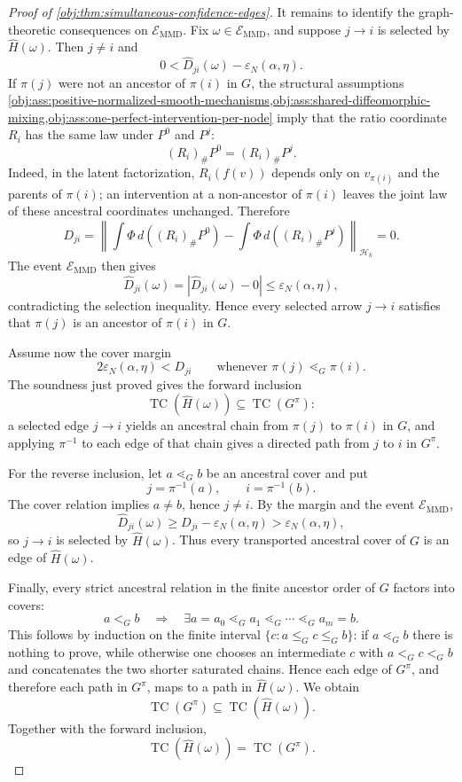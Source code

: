\begin{proof}[Proof of \cref{obj:thm:simultaneous-confidence-edges}]
It remains to identify the graph-theoretic consequences on \(\mathcal E_{\mathrm{MMD}}\).  Fix \(\omega\in\mathcal E_{\mathrm{MMD}}\), and suppose \(j\to i\) is selected by \(\widehat H(\omega)\).  Then \(j\ne i\) and
\[
0<\widehat D_{ji}(\omega)-\varepsilon_N(\alpha,\eta).
\]
If \(\pi(j)\) were not an ancestor of \(\pi(i)\) in \(G\), the structural assumptions
\cref{obj:ass:positive-normalized-smooth-mechanisms,obj:ass:shared-diffeomorphic-mixing,obj:ass:one-perfect-intervention-per-node} imply that the ratio coordinate \(R_i\) has the same law under \(P^0\) and \(P^j\):
\[
(R_i)_\#P^0=(R_i)_\#P^j.
\]
Indeed, in the latent factorization, \(R_i(f(v))\) depends only on \(v_{\pi(i)}\) and the parents of \(\pi(i)\); an intervention at a non-ancestor of \(\pi(i)\) leaves the joint law of these ancestral coordinates unchanged.  Therefore
\[
D_{ji}
=
\left\|
\int\Phi\,d((R_i)_\#P^0)
-
\int\Phi\,d((R_i)_\#P^j)
\right\|_{\mathcal H_k}
=0.
\]
The event \(\mathcal E_{\mathrm{MMD}}\) then gives
\[
\widehat D_{ji}(\omega)
=
|\widehat D_{ji}(\omega)-0|
\le
\varepsilon_N(\alpha,\eta),
\]
contradicting the selection inequality.  Hence every selected arrow \(j\to i\) satisfies that \(\pi(j)\) is an ancestor of \(\pi(i)\) in \(G\).

Assume now the cover margin
\[
2\varepsilon_N(\alpha,\eta)<D_{ji}
\qquad
\text{whenever }\pi(j)\lessdot_G\pi(i).
\]
The soundness just proved gives the forward inclusion
\[
\operatorname{TC}(\widehat H(\omega))
\subseteq
\operatorname{TC}(G^\pi):
\]
a selected edge \(j\to i\) yields an ancestral chain from \(\pi(j)\) to \(\pi(i)\) in \(G\), and applying \(\pi^{-1}\) to each edge of that chain gives a directed path from \(j\) to \(i\) in \(G^\pi\).

For the reverse inclusion, let \(a\lessdot_G b\) be an ancestral cover and put
\[
j=\pi^{-1}(a),
\qquad
i=\pi^{-1}(b).
\]
The cover relation implies \(a\ne b\), hence \(j\ne i\).  By the margin and the event \(\mathcal E_{\mathrm{MMD}}\),
\[
\widehat D_{ji}(\omega)
\ge
D_{ji}-\varepsilon_N(\alpha,\eta)
>
\varepsilon_N(\alpha,\eta),
\]
so \(j\to i\) is selected by \(\widehat H(\omega)\).  Thus every transported ancestral cover of \(G\) is an edge of \(\widehat H(\omega)\).

Finally, every strict ancestral relation in the finite ancestor order of \(G\) factors into covers:
\[
a<_G b
\quad\Longrightarrow\quad
\exists a=a_0\lessdot_G a_1\lessdot_G\cdots\lessdot_G a_m=b.
\]
This follows by induction on the finite interval
\(\{c:a\le_G c\le_G b\}\): if \(a\lessdot_G b\) there is nothing to prove, while otherwise one chooses an intermediate \(c\) with \(a<_G c<_G b\) and concatenates the two shorter saturated chains.  Hence each edge of \(G^\pi\), and therefore each path in \(G^\pi\), maps to a path in \(\widehat H(\omega)\).  We obtain
\[
\operatorname{TC}(G^\pi)
\subseteq
\operatorname{TC}(\widehat H(\omega)).
\]
Together with the forward inclusion,
\[
\operatorname{TC}(\widehat H(\omega))
=
\operatorname{TC}(G^\pi).
\]
\end{proof}
